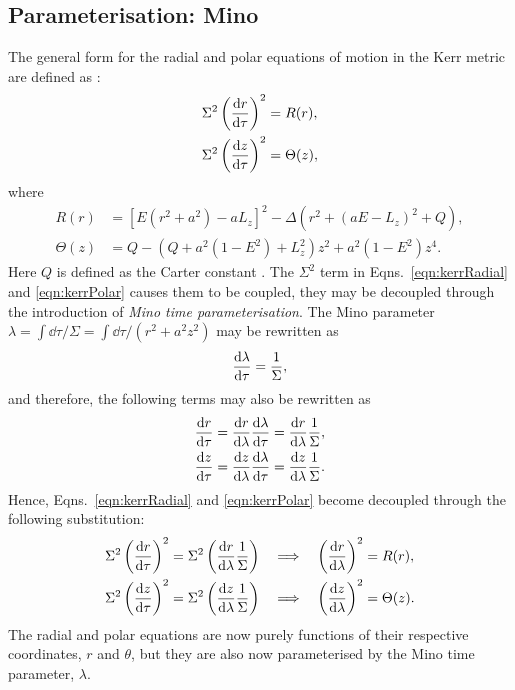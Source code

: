 
\subsection{Parameterisation: Mino}
The general form for the radial and polar equations of motion in the Kerr metric are defined as \cite{resoFujita}:
\begin{align}
    \Sigma^2\left(\dv{r}{\tau}\right)^2&=R(r),\label{eqn:kerrRadial}\\
    \Sigma^2\left(\dv{z}{\tau}\right)^2&=\Theta(z),\label{eqn:kerrPolar}
\end{align}
where
\begin{align}
    R(r)&=[E(r^2+a^2)-aL_z]^2-\Delta(r^2+(aE-L_z)^2+Q),\\
    \Theta(z)&=Q-(Q+a^2(1-E^2)+L^2_z)z^2+a^2(1-E^2)z^4.
\end{align}
Here $Q$ is defined as the Carter constant \cite{carterDefinition}.
The $\Sigma^2$ term in Eqns.~\eqref{eqn:kerrRadial} and \eqref{eqn:kerrPolar} causes them to be coupled, they may be decoupled through the introduction of \textit{Mino time parameterisation}.
The Mino parameter $\lambda=\int \dd{\tau}/\Sigma=\int \dd{\tau}/(r^2+a^2z^2)$ may be rewritten as
\begin{equation}
\dv{\lambda}{\tau}=\frac{1}{\Sigma},
\end{equation}
and therefore, the following terms may also be rewritten as
\begin{align}
\dv{r}{\tau}&=\dv{r}{\lambda}\dv{\lambda}{\tau}=\dv{r}{\lambda}\frac{1}{\Sigma},\\
\dv{z}{\tau}&=\dv{z}{\lambda}\dv{\lambda}{\tau}=\dv{z}{\lambda}\frac{1}{\Sigma}.
\end{align}
Hence, Eqns.~\eqref{eqn:kerrRadial} and \eqref{eqn:kerrPolar} become decoupled through the following substitution:
\begin{align}
    \Sigma^2\left(\dv{r}{\tau}\right)^2&=\Sigma^2\left(\dv{r}{\lambda}\frac{1}{\Sigma} \right)\quad \Longrightarrow \quad \left(\dv{r}{\lambda} \right)^2=R(r),\\
    \Sigma^2\left(\dv{z}{\tau}\right)^2&=\Sigma^2\left(\dv{z}{\lambda}\frac{1}{\Sigma} \right)\quad \Longrightarrow \quad\left(\dv{z}{\lambda} \right)^2=\Theta(z).
\end{align}
The radial and polar equations are now purely functions of their respective coordinates, $r$ and $\theta$, but they are also now parameterised by the Mino time parameter, $\lambda$.

